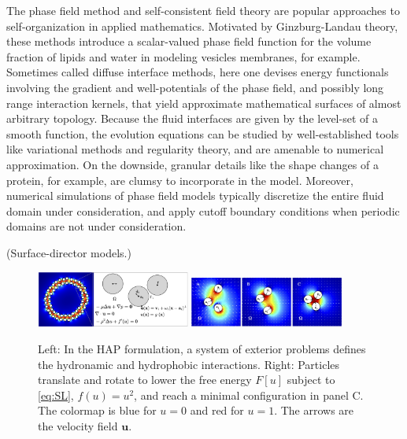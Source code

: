 The phase field method and self-consistent field theory are popular  
approaches to self-organization in applied mathematics.
Motivated by Ginzburg-Landau theory, these methods introduce a scalar-valued
phase field function for the volume fraction of
lipids and water in modeling vesicles membranes, for example. 
Sometimes called diffuse interface methods, here one devises energy functionals
involving the gradient and well-potentials of the phase field, and possibly
long range interaction kernels, that yield approximate mathematical surfaces
of almost arbitrary topology.
Because the fluid interfaces are given by the level-set
of a smooth function, the evolution equations
can be studied by well-established tools like variational methods
and regularity theory, and are amenable to numerical approximation.
On the downside, granular details like the shape changes of a protein, for
example, are clumsy to incorporate in the model.  Moreover, numerical
simulations of phase field models typically discretize the entire fluid
domain under consideration, and apply cutoff boundary conditions
when periodic domains are not under consideration. 

(Surface-director models.)

\begin{figure}
  \begin{center}
    \includegraphics[width=0.45\textwidth]{figures/SpecificAim1/Domain.jpg}
 \includegraphics[width=0.45\textwidth]{figures/SpecificAim1/3Particles.jpg}
  \end{center}
  \caption{\label{fig:flow_map}
   Left: In the HAP formulation,
   a system of exterior problems 
   defines the hydronamic and hydrophobic interactions.
  Right:
     Particles translate and rotate to lower the free energy $F[u]$
   subject to \eqref{eq:SL}, $f(u) = u^2$, and reach a minimal configuration in
   panel C. The colormap is blue for $u = 0$ and red for $u = 1$.
   The arrows are the velocity field $\mathbf{u}$.}
\end{figure}



